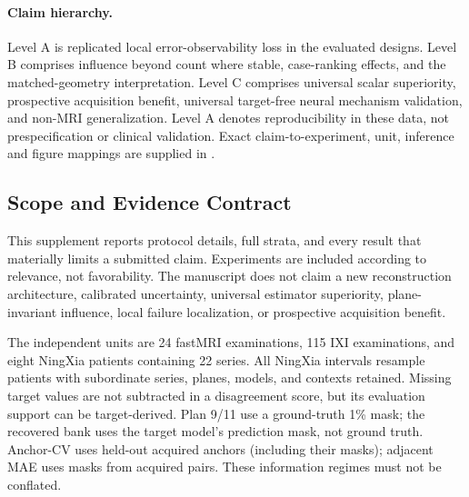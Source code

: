 \paragraph{Claim hierarchy.}
Level A is replicated local error-observability loss in the evaluated designs. Level B comprises influence beyond count where stable, case-ranking effects, and the matched-geometry interpretation. Level C comprises universal scalar superiority, prospective acquisition benefit, universal target-free neural mechanism validation, and non-MRI generalization. Level A denotes reproducibility in these data, not prespecification or clinical validation. Exact claim-to-experiment, unit, inference and figure mappings are supplied in .

\subsection{Scope and Evidence Contract}
This supplement reports protocol details, full strata, and every result that materially limits a submitted claim. Experiments are included according to relevance, not favorability. The manuscript does not claim a new reconstruction architecture, calibrated uncertainty, universal estimator superiority, plane-invariant influence, local failure localization, or prospective acquisition benefit.

The independent units are 24 fastMRI examinations, 115 IXI examinations, and eight NingXia patients containing 22 series. All NingXia intervals resample patients with subordinate series, planes, models, and contexts retained. Missing target values are not subtracted in a disagreement score, but its evaluation support can be target-derived. Plan 9/11 use a ground-truth 1\% mask; the recovered bank uses the target model's prediction mask, not ground truth. Anchor-CV uses held-out acquired anchors (including their masks); adjacent MAE uses masks from acquired pairs. These information regimes must not be conflated.

